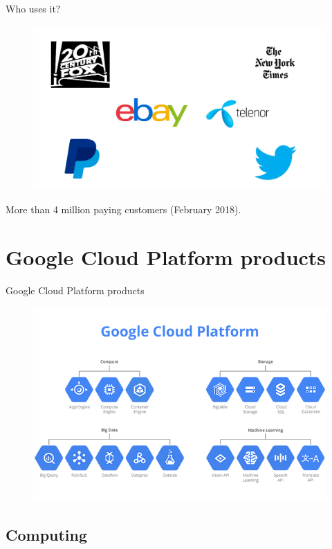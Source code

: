 \documentclass{beamer}
\begin{document}
\begin{frame}[fragile]{Who uses it?}
\begin{figure}[H]
  \centering
  \includegraphics[scale=0.35]{logos.png}
\end{figure}
More than 4 million paying customers (February 2018).
\end{frame}

\section{Google Cloud Platform products}

\begin{frame}[fragile]{Google Cloud Platform products}
\begin{figure}[H]
  \centering
  \includegraphics[width = \textwidth]{img/cloud_products_big}
\end{figure}

\end{frame}

\subsection{Computing}
\end{document}
